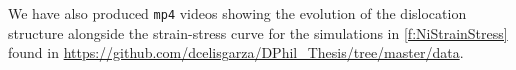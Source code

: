 We have also produced \texttt{mp4} videos showing the evolution of the dislocation structure alongside the strain-stress curve for the simulations in \cref{f:NiStrainStress} found in \href{https://github.com/dcelisgarza/DPhil_Thesis/tree/master/data}{https://github.com/dcelisgarza/DPhil\_Thesis/tree/master/data}.




